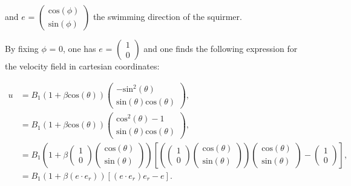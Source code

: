 \documentclass{article}
\begin{document}
and $e$ = 
$\begin{pmatrix}
   \mathrm{cos}(\phi) \\
   \mathrm{sin}(\phi) \end{pmatrix}$ the swimming direction of the squirmer. 
   
   By fixing $\phi$ = 0, one has $e$ = $\begin{pmatrix}
   1 \\
   0 \end{pmatrix}$ and one finds the following expression for the velocity field 
   in cartesian coordinates: 

\begin{align*}
u &= B_1 \left(1+\beta \mathrm{cos}(\theta) \right) \begin{pmatrix}
   -\mathrm{sin}^2(\theta) \\
   \mathrm{sin}(\theta)\mathrm{cos}(\theta)
\end{pmatrix},  \\
&= B_1 \left(1+\beta \mathrm{cos}(\theta) \right) \begin{pmatrix}
   \mathrm{cos}^2(\theta)-1 \\
   \mathrm{sin}(\theta)\mathrm{cos}(\theta)
\end{pmatrix}, \\
&= B_1 \left(1+\beta \begin{pmatrix}
   1 \\
   0 \end{pmatrix}\begin{pmatrix}
   \mathrm{cos}(\theta) \\
   \mathrm{sin}(\theta)
\end{pmatrix}\right) \left[ \left( \begin{pmatrix}
   1 \\
   0 \end{pmatrix}\begin{pmatrix}
   \mathrm{cos}(\theta) \\
   \mathrm{sin}(\theta)
\end{pmatrix}\right) \begin{pmatrix}
   \mathrm{cos}(\theta) \\
   \mathrm{sin}(\theta)
\end{pmatrix} - \begin{pmatrix}
   1 \\
   0 \end{pmatrix}\right], \\
&= B_1(1+\beta (e \cdot e_r)) [(e \cdot e_r)e_r - e]. 

\end{align*}
\end{document}
